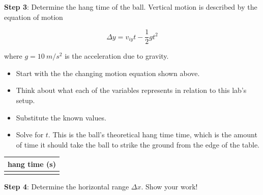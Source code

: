 \documentclass[../main-physics-problems.tex]{subfiles}
\begin{document}
\noindent \textbf{Step 3}: Determine the hang time of the ball. Vertical motion is described by the equation of motion

\begin{equation*}
    \Delta y = v_{iy} t - \frac{1}{2} g t^2
\end{equation*}

\noindent where $g = \SI{10}{m/s^2}$ is the acceleration due to gravity.

\begin{itemize}[topsep=2pt,itemsep=0pt]
    \item Start with the the changing motion equation shown above.
    \item Think about what each of the variables represents in relation to this lab's setup.
    \item Substitute the known values. 
    \item Solve for $t$. This is the ball's theoretical hang time time, which is the amount of time it should take the ball to strike the ground from the edge of the table.
\end{itemize}


%
\hspace{5mm}
\begin{minipage}{0.25\textwidth}
\begin{center}
    \begin{tabular}{|c|}
        \hline
         \textbf{hang time} (s)\\
         \hline \\[1em]
         \hline
    \end{tabular}
\end{center} 
\end{minipage}

\medskip


\bigskip

\noindent \textbf{Step 4}: Determine the horizontal range $\Delta x$. Show your work!
\end{document}
